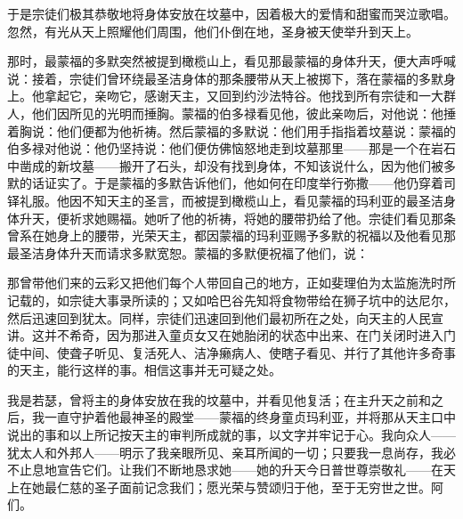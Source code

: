 于是宗徒们极其恭敬地将身体安放在坟墓中，因着极大的爱情和甜蜜而哭泣歌唱。忽然，有光从天上照耀他们周围，他们仆倒在地，圣身被天使举升到天上。\par

那时，最蒙福的多默突然被提到橄榄山上，看见那最蒙福的身体升天，便大声呼喊说：接着，宗徒们曾环绕最圣洁身体的那条腰带从天上被掷下，落在蒙福的多默身上。他拿起它，亲吻它，感谢天主，又回到约沙法特谷。他找到所有宗徒和一大群人，他们因所见的光明而捶胸。蒙福的伯多禄看见他，彼此亲吻后，对他说：他捶着胸说：他们便都为他祈祷。然后蒙福的多默说：他们用手指指着坟墓说：蒙福的伯多禄对他说：他仍坚持说：他们便仿佛恼怒地走到坟墓那里——那是一个在岩石中凿成的新坟墓——搬开了石头，却没有找到身体，不知该说什么，因为他们被多默的话证实了。于是蒙福的多默告诉他们，他如何在印度举行弥撒——他仍穿着司铎礼服。他因不知天主的圣言，而被提到橄榄山上，看见蒙福的玛利亚的最圣洁身体升天，便祈求她赐福。她听了他的祈祷，将她的腰带扔给了他。宗徒们看见那条曾系在她身上的腰带，光荣天主，都因蒙福的玛利亚赐予多默的祝福以及他看见那最圣洁身体升天而请求多默宽恕。蒙福的多默便祝福了他们，说：\par

那曾带他们来的云彩又把他们每个人带回自己的地方，正如斐理伯为太监施洗时所记载的，如宗徒大事录所读的；又如哈巴谷先知将食物带给在狮子坑中的达尼尔，然后迅速回到犹太。同样，宗徒们迅速回到他们最初所在之处，向天主的人民宣讲。这并不希奇，因为那进入童贞女又在她胎闭的状态中出来、在门关闭时进入门徒中间、使聋子听见、复活死人、洁净癞病人、使瞎子看见、并行了其他许多奇事的天主，能行这样的事。相信这事并无可疑之处。\par

我是若瑟，曾将主的身体安放在我的坟墓中，并看见他复活；在主升天之前和之后，我一直守护着他最神圣的殿堂——蒙福的终身童贞玛利亚，并将那从天主口中说出的事和以上所记按天主的审判所成就的事，以文字并牢记于心。我向众人——犹太人和外邦人——明示了我亲眼所见、亲耳所闻的一切；只要我一息尚存，我必不止息地宣告它们。让我们不断地恳求她——她的升天今日普世尊崇敬礼——在天上在她最仁慈的圣子面前记念我们；愿光荣与赞颂归于他，至于无穷世之世。阿们。\par

